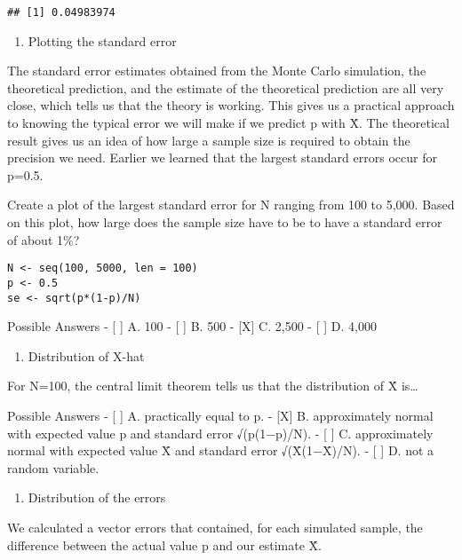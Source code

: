 \documentclass[
]{article}
\providecommand{\tightlist}{%
  \setlength{\itemsep}{0pt}\setlength{\parskip}{0pt}}
\begin{document}
\begin{verbatim}
## [1] 0.04983974
\end{verbatim}

\begin{enumerate}
\def\labelenumi{\arabic{enumi}.}
\setcounter{enumi}{7}
\tightlist
\item
  Plotting the standard error
\end{enumerate}

The standard error estimates obtained from the Monte Carlo simulation,
the theoretical prediction, and the estimate of the theoretical
prediction are all very close, which tells us that the theory is
working. This gives us a practical approach to knowing the typical error
we will make if we predict p with X̂. The theoretical result gives us an
idea of how large a sample size is required to obtain the precision we
need. Earlier we learned that the largest standard errors occur for
p=0.5.

Create a plot of the largest standard error for N ranging from 100 to
5,000. Based on this plot, how large does the sample size have to be to
have a standard error of about 1\%?

\begin{verbatim}
N <- seq(100, 5000, len = 100)
p <- 0.5
se <- sqrt(p*(1-p)/N)
\end{verbatim}

Possible Answers - {[} {]} A. 100 - {[} {]} B. 500 - {[}X{]} C. 2,500 -
{[} {]} D. 4,000

\begin{enumerate}
\def\labelenumi{\arabic{enumi}.}
\setcounter{enumi}{8}
\tightlist
\item
  Distribution of X-hat
\end{enumerate}

For N=100, the central limit theorem tells us that the distribution of X̂
is\ldots{}

Possible Answers - {[} {]} A. practically equal to p. - {[}X{]} B.
approximately normal with expected value p and standard error
√(p(1−p)/N). - {[} {]} C. approximately normal with expected value X̄ and
standard error √(X̄(1−X̄)/N). - {[} {]} D. not a random variable.

\begin{enumerate}
\def\labelenumi{\arabic{enumi}.}
\setcounter{enumi}{9}
\tightlist
\item
  Distribution of the errors
\end{enumerate}

We calculated a vector errors that contained, for each simulated sample,
the difference between the actual value p and our estimate X̂.
\end{document}
